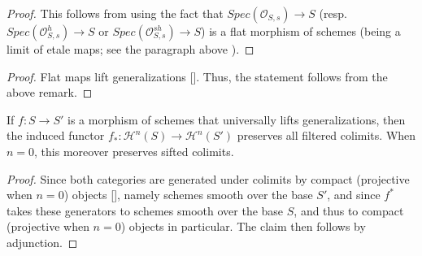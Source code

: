 \begin{proof}
    This follows from  using the fact that $Spec(\mathcal{O}_{S,s})\to S$ (resp. $Spec(\mathcal{O}_{S,s}^h)\to S$ or $Spec(\mathcal{O}_{S,s}^{sh})\to S$) is a flat morphism of schemes (being a limit of etale maps; see the paragraph above ).
\end{proof} 
\begin{proof}
    Flat maps lift generalizations [\cite[\href{https://stacks.math.columbia.edu/tag/03HV}{Tag 03HV}]{stacks-project}]. Thus, the statement follows from the above remark.
\end{proof}
\begin{prop}
    If $f:S\to S' $ is a morphism of schemes that universally lifts generalizations, then the induced functor $f_*:\mathcal{H}^n(S)\to \mathcal{H}^n(S')$ preserves all filtered colimits. When $n=0$, this moreover preserves sifted colimits. 
\end{prop}
\begin{proof}
    Since both categories are generated under colimits by compact (projective when $n=0$) objects [], namely schemes smooth over the base $S'$, and since $f^*$ takes these generators to schemes smooth over the base $S$, and thus to compact (projective when $n=0$) objects in particular. The claim then follows by adjunction.
\end{proof}

